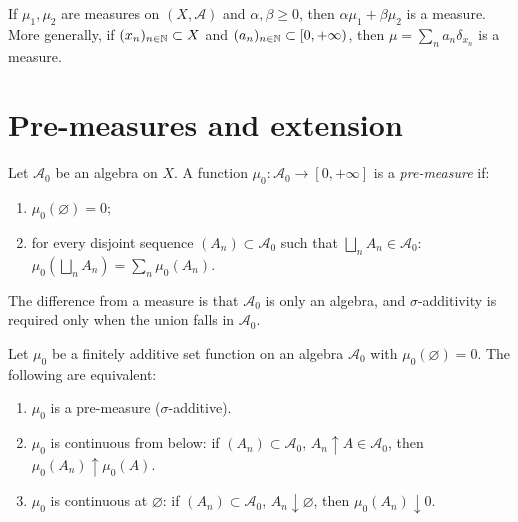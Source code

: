 \begin{example}
If $\mu_1, \mu_2$ are measures on $(X, \mathcal{A})$ and $\alpha, \beta \geq 0$,
then $\alpha \mu_1 + \beta \mu_2$ is a measure. More generally, if
$(x_n)_{n \in \mathbb{N}} \subset X$ and $(a_n)_{n \in \mathbb{N}} \subset [0, +\infty)$, then
$\mu = \sum_n a_n \delta_{x_n}$ is a measure.
\end{example}

\section{Pre-measures and extension}

\begin{definition}
Let $\mathcal{A}_0$ be an algebra on $X$. A function
$\mu_0 : \mathcal{A}_0 \to [0, +\infty]$ is a \emph{pre-measure} if:
\begin{enumerate}
    \item[(i)] $\mu_0(\varnothing) = 0$;
    \item[(ii)] for every disjoint sequence $(A_n) \subset \mathcal{A}_0$ such that
    $\bigsqcup_n A_n \in \mathcal{A}_0$:
    $\mu_0\!\left(\bigsqcup_n A_n\right) = \sum_n \mu_0(A_n)$.
\end{enumerate}
\end{definition}

\begin{remark}
The difference from a measure is that $\mathcal{A}_0$ is only an algebra, and
$\sigma$-additivity is required only when the union falls in $\mathcal{A}_0$.
\end{remark}

\begin{proposition}
\label{prop:sigma_add_criterion}
Let $\mu_0$ be a finitely additive set function on an algebra $\mathcal{A}_0$ with
$\mu_0(\varnothing) = 0$. The following are equivalent:
\begin{enumerate}
    \item $\mu_0$ is a pre-measure ($\sigma$-additive).
    \item $\mu_0$ is continuous from below: if $(A_n) \subset \mathcal{A}_0$,
    $A_n \uparrow A \in \mathcal{A}_0$, then $\mu_0(A_n) \uparrow \mu_0(A)$.
    \item $\mu_0$ is continuous at $\varnothing$: if $(A_n) \subset \mathcal{A}_0$,
    $A_n \downarrow \varnothing$, then $\mu_0(A_n) \downarrow 0$.
\end{enumerate}
\end{proposition}

